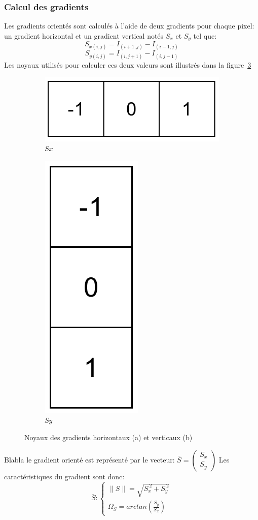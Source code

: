 \documentclass[12pt]{article}
\begin{document}
\subsubsection{Calcul des gradients}
Les gradients orientés sont calculés à l'aide de deux gradients pour chaque pixel: un gradient horizontal et un gradient vertical notés $S_{x}$ et $S_{y}$ tel que:
\[S_{x(i,j)}=I_{(i+1,j)}-I_{(i-1,j)}\]
\[S_{y(i,j)}=I_{(i,j+1)}-I_{(i,j-1)}\]
Les noyaux utilisés pour calculer ces deux valeurs sont illustrés dans la figure~\ref{fig:kernels}
\begin{figure}[!ht]
\centering
\begin{subfigure}{.3\textwidth}
  \centering
  \includegraphics[width=.45\linewidth]{img/Sx.png}
  \caption{$Sx$}
  \label{fig:kernel_sx}
\end{subfigure}
\begin{subfigure}{.3\textwidth}
  \centering
  \includegraphics[width=.15\linewidth]{img/Sy.png}
  \caption{$Sy$}
  \label{fig:kernel_sy}
\end{subfigure}
\caption{Noyaux des gradients horizontaux (a) et verticaux (b)}
\label{fig:kernels}
\end{figure}
Blabla le gradient orienté est représenté par le vecteur: 
$\bar{S}=\begin{pmatrix}S_{x}\\S_{y}\end{pmatrix}$
Les caractéristiques du gradient sont donc:
\[\bar{S}:\begin{cases}
\|S\|=\sqrt{S_{x}^{~2}+S_{y}^{~2}}\\
\Omega_{S} = arctan(\frac{S_{y}}{S_{x}})
\end{cases}\]
\end{document}

